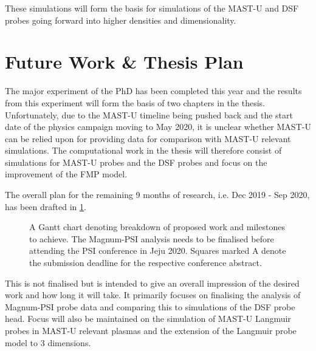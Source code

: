 \documentclass[a4paper, 12pt]{article} %
\begin{document}
    These simulations will form the basis for simulations of the MAST-U and DSF probes going forward into higher densities and dimensionality. 


\section{\label{sec:phd}Future Work \& Thesis Plan}
    The major experiment of the PhD has been completed this year and the results from this experiment will form the basis of two chapters in the thesis. 
    Unfortunately, due to the MAST-U timeline being pushed back and the start date of the physics campaign moving to May 2020, it is unclear whether MAST-U can be relied upon for providing data for comparison with MAST-U relevant simulations. 
    The computational work in the thesis will therefore consist of simulations for MAST-U probes and the DSF probes and focus on the improvement of the FMP model. 
    
	The overall plan for the remaining 9 months of research, i.e. Dec 2019 - Sep 2020, has been drafted in \cref{fig:timeline}.
	\begin{figure}[t]
		\vspace{-0pt}
		\caption{A Gantt chart denoting breakdown of proposed work and milestones to achieve. The Magnum-PSI analysis needs to be finalised before attending the PSI conference in Jeju 2020. Squares marked A denote the submission deadline for the respective conference abstract.}
		\label{fig:timeline} 
	\end{figure}
	This is not finalised but is intended to give an overall impression of the desired work and how long it will take. 
	It primarily focuses on finalising the analysis of Magnum-PSI probe data and comparing this to simulations of the DSF probe head. 
	Focus will also be maintained on the simulation of MAST-U Langmuir probes in MAST-U relevant plasmas and the extension of the Langmuir probe model to 3 dimensions. 
	
\end{document}
